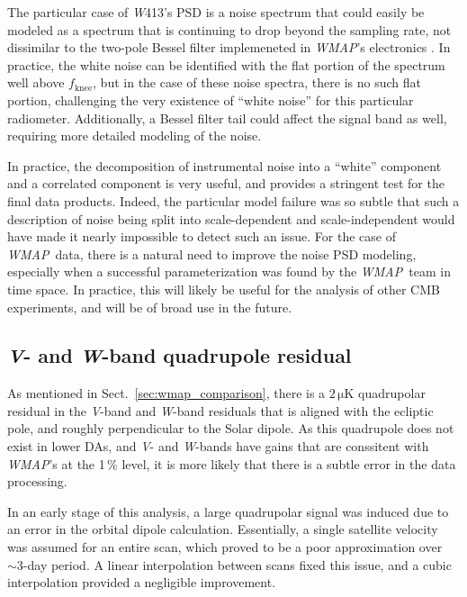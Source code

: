 \documentclass[twocolumn]{../../common/aa}
\def\WMAP{\emph{WMAP}}
\newcommand{\V}[0]{\textit V}
\newcommand{\W}[0]{\textit W}
\begin{document}

The particular case of \W413's PSD is a noise spectrum that could easily be modeled as a spectrum that is continuing to drop beyond the sampling rate, not dissimilar to the two-pole Bessel filter implemeneted in \WMAP's electronics \citep{jarosik2003:MAP}. In practice, the white noise can be identified with the flat portion of the spectrum well above $f_\mathrm{knee}$, but in the case of these noise spectra, there is no such flat portion, challenging the very existence of ``white noise'' for this particular radiometer. Additionally, a Bessel filter tail could affect the signal band as well, requiring more detailed modeling of the noise.

In practice, the decomposition of instrumental noise into a ``white'' component and a correlated component is very useful, and provides a stringent test for the final data products. Indeed, the particular model failure was so subtle that such a description of noise being split into scale-dependent and scale-independent would have made it nearly impossible to detect such an issue.
For the case of \WMAP\ data, there is a natural need to improve the noise PSD modeling, especially when a successful parameterization was found by the \WMAP\ team in time space. In practice, this will likely be useful for the analysis of other CMB experiments, and will be of broad use in the future.

\subsection{\V- and \W-band quadrupole residual}
\label{sec:quadres}

As mentioned in Sect.~\ref{sec:wmap_comparison}, there is a $2\,\mathrm{\mu K}$ quadrupolar residual in the \V-band and \W-band residuals that is aligned with the ecliptic pole, and roughly perpendicular to the Solar dipole. As this quadrupole does not exist in lower DAs, and \V- and \W-bands have gains that are conssitent with \WMAP's at the 1\,\% level, it is more likely that there is a subtle error in the data processing.

In an early stage of this analysis, a large quadrupolar signal was induced due to an error in the orbital dipole calculation. Essentially, a single satellite velocity was assumed for an entire scan, which proved to be a poor approximation over $\sim3$-day period. A linear interpolation between scans fixed this issue, and a cubic interpolation provided a negligible improvement.
\end{document}
